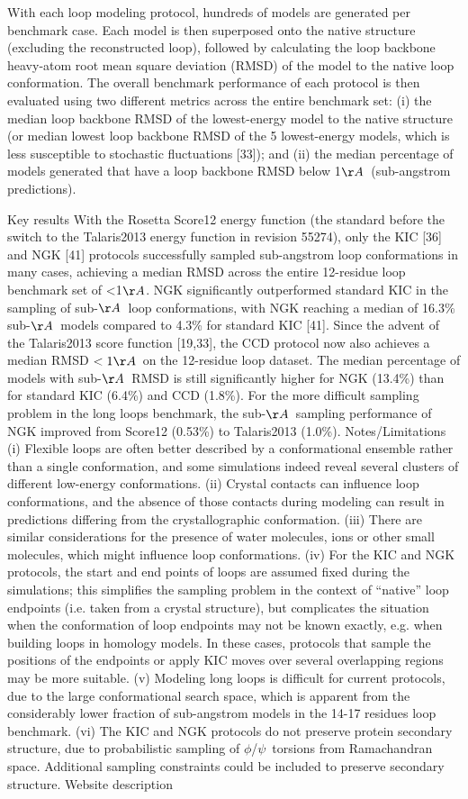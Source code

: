 With each loop modeling protocol, hundreds of models are generated per benchmark case. Each model is then superposed onto the native structure (excluding the reconstructed loop), followed by calculating the loop backbone heavy-atom root mean square deviation (RMSD) of the model to the native loop conformation. The overall benchmark performance of each protocol is then evaluated using two different metrics across the entire benchmark set: (i) the median loop backbone RMSD of the lowest-energy model to the native structure (or median lowest loop backbone RMSD of the 5 lowest-energy models, which is less susceptible to stochastic fluctuations [33]); and (ii) the median percentage of models generated that have a loop backbone RMSD below 1$\AA$\ (sub-angstrom predictions).

Key results
With the Rosetta Score12 energy function (the standard before the switch to the Talaris2013 energy function in revision 55274), only the KIC [36] and NGK [41] protocols successfully sampled sub-angstrom loop conformations in many cases, achieving a median RMSD across the entire 12-residue loop benchmark set of <1$\AA$. NGK significantly outperformed standard KIC in the sampling of sub-$\AA$\ loop conformations, with NGK reaching a median of 16.3\% sub-$\AA$\ models compared to 4.3\% for standard KIC [41]. Since the advent of the Talaris2013 score function [19,33], the CCD protocol now also achieves a median RMSD $< 1\AA$\ on the 12-residue loop dataset. The median percentage of models with sub-$\AA$\ RMSD is still significantly higher for NGK (13.4\%) than for standard KIC (6.4\%) and CCD (1.8\%). For the more difficult sampling problem in the long loops benchmark, the sub-$\AA$\ sampling performance of NGK improved from Score12 (0.53\%) to Talaris2013 (1.0\%).
Notes/Limitations
(i) Flexible loops are often better described by a conformational ensemble rather than a single conformation, and some simulations indeed reveal several clusters of different low-energy conformations. (ii) Crystal contacts can influence loop conformations, and the absence of those contacts during modeling can result in predictions differing from the crystallographic conformation. (iii) There are similar considerations for the presence of water molecules, ions or other small molecules, which might influence loop conformations. (iv) For the KIC and NGK protocols, the start and end points of loops are assumed fixed during the simulations; this simplifies the sampling problem in the context of “native” loop endpoints (i.e. taken from a crystal structure), but complicates the situation when the conformation of loop endpoints may not be known exactly, e.g. when building loops in homology models. In these cases, protocols that sample the positions of the endpoints or apply KIC moves over several overlapping regions may be more suitable. (v) Modeling long loops is difficult for current protocols, due to the large conformational search space, which is apparent from the considerably lower fraction of sub-angstrom models in the 14-17 residues loop benchmark. (vi) The KIC and NGK protocols do not preserve protein secondary structure, due to probabilistic sampling of $\phi$/$\psi$\ torsions from Ramachandran space. Additional sampling constraints could be included to preserve secondary structure.
Website description

